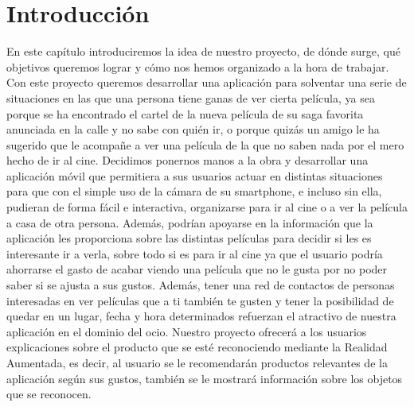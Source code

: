 
\cleardoublepage


\chapter{Introducción}
\label{makereference}


    En este capítulo introduciremos la idea de nuestro proyecto, de dónde surge, qué objetivos queremos lograr y cómo nos hemos organizado a la hora de trabajar.
    Con este proyecto queremos desarrollar una aplicación para solventar una serie de situaciones en las que una persona
    tiene ganas de ver cierta película, ya sea porque se ha encontrado el cartel de la nueva película
    de su saga favorita anunciada en la calle y no sabe con quién ir, o porque quizás un amigo le ha sugerido que le acompañe
    a ver una película de la que no saben nada por el mero hecho de ir al cine. 
    Decidimos ponernos manos a la obra y desarrollar una aplicación móvil que permitiera a sus usuarios actuar en distintas situaciones
    para que con el simple uso de la cámara de su smartphone, e incluso sin ella, pudieran de forma
    fácil e interactiva, organizarse para ir al cine o a ver la película a casa de otra persona. Además, podrían apoyarse en la 
    información que la aplicación les proporciona sobre las distintas películas para decidir si les es interesante ir a verla, sobre todo 
    si es para ir al cine ya que el usuario podría ahorrarse el gasto de acabar viendo una película que no le gusta por no poder saber si se 
    ajusta a sus gustos. Además, tener una red de contactos de personas interesadas en ver películas que a ti también te gusten y tener la posibilidad
    de quedar en un lugar, fecha y hora determinados refuerzan el atractivo de nuestra aplicación en el dominio del ocio.
    Nuestro proyecto ofrecerá a los usuarios explicaciones sobre el producto que se esté reconociendo mediante la Realidad Aumentada, es decir, al usuario se le 
    recomendarán productos relevantes de la aplicación según sus gustos, también se le mostrará información sobre los objetos que se reconocen.

